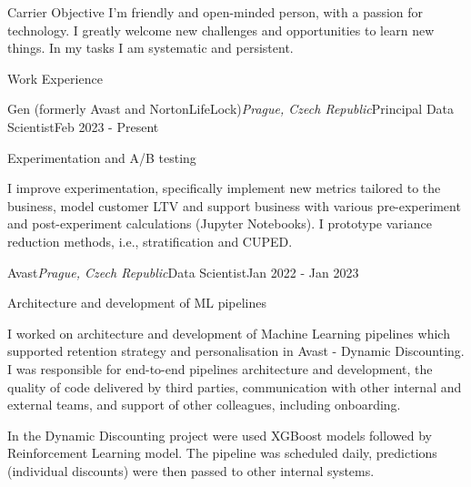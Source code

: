 \documentclass{resume} %
\begin{document}
\begin{rSection}{Carrier Objective}
I’m friendly and open-minded person, with a passion for technology. I greatly welcome new challenges and opportunities to learn new things. In my tasks I am systematic and persistent.
\end{rSection}

\begin{rSection}{Work Experience}
 
    \begin{rSubsection}{Gen (formerly Avast and NortonLifeLock)}{\em Prague, Czech Republic}{Principal Data Scientist}{Feb 2023 - Present}
        \item Experimentation and A/B testing
        
        I improve experimentation, specifically implement new metrics tailored to the business, model customer LTV and support business with various pre-experiment and post-experiment calculations (Jupyter Notebooks). I prototype variance reduction methods, i.e., stratification and CUPED.

    \end{rSubsection}

    \begin{rSubsection}{Avast}{\em Prague, Czech Republic}{Data Scientist}{Jan 2022 - Jan 2023}
        \item Architecture and development of ML pipelines
        
        I worked on architecture and development of Machine Learning pipelines which supported retention strategy and personalisation in Avast - Dynamic Discounting. I was responsible for end-to-end pipelines architecture and development, the quality of code delivered by third parties, communication with other internal and external teams, and support of other colleagues, including onboarding.
        
        In the Dynamic Discounting project were used XGBoost models followed by Reinforcement Learning model. The pipeline was scheduled daily, predictions (individual discounts) were then passed to other internal systems.


\end{rSubsection}
\end{rSection}
\end{document}
